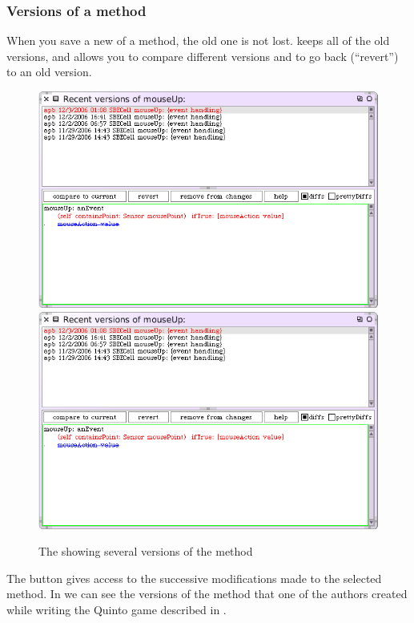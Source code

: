 \documentclass[a4paper,10pt,twoside]{book}
\begin{document}
\subsubsection{Versions of a method}
\label{sec:versions}

When you save a new  of a method, the old one is not lost.  \sq keeps all of the old versions, and allows you to compare different versions and to go back (``revert'') to an old version.
\begin{figure}[btp]
   \centering
   \ifluluelse
	   {\includegraphics[width=\textwidth]{VersionsOfMouseUp} }
	   {\includegraphics[scale=0.7]{VersionsOfMouseUp} }
   \caption{The  showing several versions of the  method}
   \label{fig:mouseUpVersions}
\end{figure}
The  button gives access to the successive modifications made to the selected method.
In  we can see the versions of the  method that one of the authors created while writing the Quinto game described in .
\end{document}
